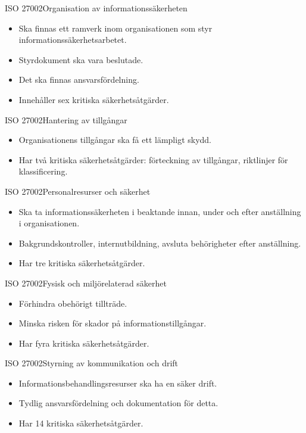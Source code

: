 \documentclass{beamer}
\begin{document}
\begin{frame}{ISO 27002}{Organisation av informationssäkerheten}
  \begin{itemize}
    \item Ska finnas ett ramverk inom organisationen som styr 
      informationssäkerhetsarbetet.
    \item Styrdokument ska vara beslutade.
    \item Det ska finnas ansvarsfördelning.
    \item Innehåller sex kritiska säkerhetsåtgärder.
  \end{itemize}
\end{frame}
\begin{frame}{ISO 27002}{Hantering av tillgångar}
  \begin{itemize}
    \item Organisationens tillgångar ska få ett lämpligt skydd.
    \item Har två kritiska säkerhetsåtgärder: förteckning av tillgångar, 
      riktlinjer för klassificering.
  \end{itemize}
\end{frame}
\begin{frame}{ISO 27002}{Personalresurser och säkerhet}
  \begin{itemize}
    \item Ska ta informationssäkerheten i beaktande innan, under och efter 
      anställning i organisationen.
    \item Bakgrundskontroller, internutbildning, avsluta behörigheter efter 
      anställning.
    \item Har tre kritiska säkerhetsåtgärder.
  \end{itemize}
\end{frame}
\begin{frame}{ISO 27002}{Fysisk och miljörelaterad säkerhet}
  \begin{itemize}
    \item Förhindra obehörigt tillträde.
    \item Minska risken för skador på informationstillgångar.
    \item Har fyra kritiska säkerhetsåtgärder.
  \end{itemize}
\end{frame}
\begin{frame}{ISO 27002}{Styrning av kommunikation och drift}
  \begin{itemize}
    \item Informationsbehandlingsresurser ska ha en säker drift.
    \item Tydlig ansvarsfördelning och dokumentation för detta.
    \item Har 14 kritiska säkerhetsåtgärder.
  \end{itemize}
\end{frame}
\end{document}
